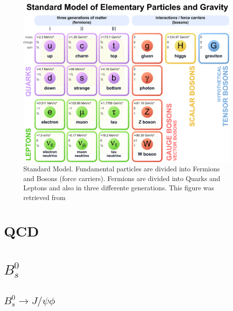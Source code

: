 \begin{figure}[htp!]
	\centering
	\includegraphics[scale=0.34]{MainContent/Figs/SM.eps}
	\caption{Standard Model. Fundamental particles are divided into Fermions and Bosons (force carriers). Fermions are divided into Quarks and Leptons and also in three differente generations. This figure was retrieved from}
	\label{fig:sm}
\end{figure}

\section{QCD}
\section{$B^0_s$}
\subsection{$B^0_s \to J/\psi\phi$}
